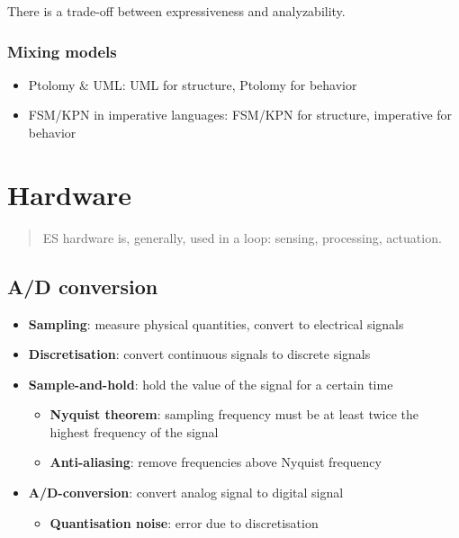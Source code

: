 \documentclass{article}
\begin{document}
There is a trade-off between expressiveness and analyzability.

\subsubsection{Mixing models}

\begin{itemize}
  \item Ptolomy \& UML: UML for structure, Ptolomy for behavior
  \item FSM/KPN in imperative languages: FSM/KPN for structure, imperative for behavior
\end{itemize}



\section{Hardware}
\begin{quote}ES hardware is, generally, used in a loop: sensing, processing, actuation.\end{quote}


\subsection{A/D conversion}
\begin{itemize}
  \item \textbf{Sampling}: measure physical quantities, convert to electrical signals
  \item \textbf{Discretisation}: convert continuous signals to discrete signals
  \item \textbf{Sample-and-hold}: hold the value of the signal for a certain time
        \begin{itemize}
          \item \textbf{Nyquist theorem}: sampling frequency must be at least twice the highest frequency of the signal
          \item \textbf{Anti-aliasing}: remove frequencies above Nyquist frequency
        \end{itemize}
  \item \textbf{A/D-conversion}: convert analog signal to digital signal
        \begin{itemize}
          \item \textbf{Quantisation noise}: error due to discretisation
        \end{itemize}
\end{itemize}
\end{document}
